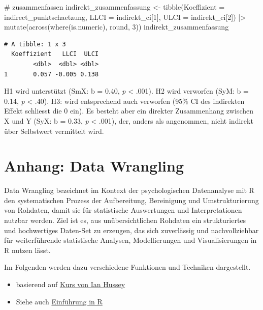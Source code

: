 \documentclass[
  letterpaper,
  DIV=11,
  numbers=noendperiod]{scrreprt}
\newenvironment{Shaded}{\begin{snugshade}}{\end{snugshade}}
\newcommand{\AttributeTok}[1]{\textcolor[rgb]{0.40,0.45,0.13}{#1}}
\newcommand{\CommentTok}[1]{\textcolor[rgb]{0.37,0.37,0.37}{#1}}
\newcommand{\DecValTok}[1]{\textcolor[rgb]{0.68,0.00,0.00}{#1}}
\newcommand{\FunctionTok}[1]{\textcolor[rgb]{0.28,0.35,0.67}{#1}}
\newcommand{\NormalTok}[1]{\textcolor[rgb]{0.00,0.23,0.31}{#1}}
\newcommand{\OtherTok}[1]{\textcolor[rgb]{0.00,0.23,0.31}{#1}}
\newcommand{\SpecialCharTok}[1]{\textcolor[rgb]{0.37,0.37,0.37}{#1}}
\providecommand{\tightlist}{%
  \setlength{\itemsep}{0pt}\setlength{\parskip}{0pt}}\usepackage{longtable,booktabs,array}
\begin{document}
\begin{tcolorbox}
\begin{Shaded}
\begin{Highlighting}[]
\CommentTok{\# zusammenfassen}
\NormalTok{indirekt\_zusammenfassung }\OtherTok{\textless{}{-}}
  \FunctionTok{tibble}\NormalTok{(}\AttributeTok{Koeffizient =}\NormalTok{ indirect\_punktschaetzung,}
         \AttributeTok{LLCI =}\NormalTok{ indirekt\_ci[}\DecValTok{1}\NormalTok{],}
         \AttributeTok{ULCI =}\NormalTok{ indirekt\_ci[}\DecValTok{2}\NormalTok{]) }\SpecialCharTok{|\textgreater{}} 
  \FunctionTok{mutate}\NormalTok{(}\FunctionTok{across}\NormalTok{(}\FunctionTok{where}\NormalTok{(is.numeric), round, }\DecValTok{3}\NormalTok{))}
\NormalTok{indirekt\_zusammenfassung}
\end{Highlighting}
\end{Shaded}

\begin{verbatim}
# A tibble: 1 x 3
  Koeffizient   LLCI  ULCI
        <dbl>  <dbl> <dbl>
1       0.057 -0.005 0.138
\end{verbatim}

H1 wird unterstützt (SmX: b = 0.40, \emph{p} \textless{} .001). H2 wird
verworfen (SyM: b = 0.14, \emph{p} \textless{} .40). H3: wird
entsprechend auch verworfen (95\% CI des indirekten Effekt schliesst die
0 ein). Es besteht aber ein direkter Zusammenhang zwischen X und Y (SyX:
b = 0.33, \emph{p} \textless{} .001), der, anders als angenommen, nicht
indirekt über Selbstwert vermittelt wird.

\end{tcolorbox}


\chapter{Anhang: Data Wrangling}\label{anhang-data-wrangling}

Data Wrangling bezeichnet im Kontext der psychologischen Datenanalyse
mit R den systematischen Prozess der Aufbereitung, Bereinigung und
Umstrukturierung von Rohdaten, damit sie für statistische Auswertungen
und Interpretationen nutzbar werden. Ziel ist es, aus unübersichtlichen
Rohdaten ein strukturiertes und hochwertiges Daten-Set zu erzeugen, das
sich zuverlässig und nachvollziehbar für weiterführende statistische
Analysen, Modellierungen und Visualisierungen in R nutzen lässt.

Im Folgenden werden dazu verschiedene Funktionen und Techniken
dargestellt.

\begin{itemize}
\tightlist
\item
  basierend auf
  \href{https://github.com/ianhussey/data-wrangling-workshop/}{Kurs von
  Ian Hussey}
\item
  Siehe auch
  \href{https://methodenlehre.github.io/einfuehrung-in-R/}{Einführung in
  R}
\end{itemize}
\end{document}

